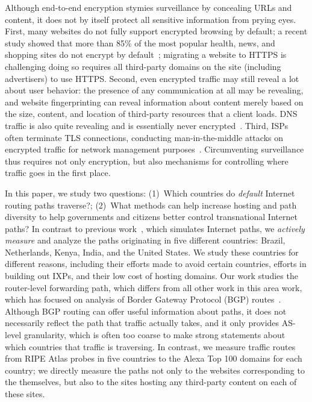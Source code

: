 Although end-to-end encryption stymies surveillance by
concealing URLs and content, it does not by itself protect all sensitive
information from prying eyes. First, many websites do not fully support
encrypted browsing by default; a recent study showed that more than 85\%
of the most popular health, news, and shopping sites do not encrypt by
default~\cite{what_isps_can_see}; migrating a website to HTTPS is
challenging doing so requires all third-party domains on the site
(including advertisers) to use HTTPS.  Second, even encrypted traffic
may still reveal a lot about user behavior: the presence of any
communication at all may be revealing, and website fingerprinting can
reveal information about content merely based on the size, content, and
location of third-party resources that a client loads. DNS traffic is
also quite revealing and is essentially never
encrypted~\cite{what_isps_can_see}.  Third, ISPs often terminate TLS
connections, conducting man-in-the-middle attacks on encrypted traffic
for network management purposes~\cite{mitm_isp}. Circumventing
surveillance thus requires not only encryption, but also mechanisms
for controlling where traffic goes in the first place.

In this paper, we study two questions: (1)~Which countries do {\em
  default} Internet routing paths traverse?; (2)~What methods can help
increase hosting and path diversity to help governments and citizens
better control transnational Internet paths?  In contrast to previous
work~\cite{karlin2009nation}, which simulates Internet paths, we
\textit{actively measure} and analyze the paths originating in five
different countries: Brazil, Netherlands, Kenya, India, and the United
States.  We study these countries for different reasons, including their
efforts made to avoid certain countries, efforts in building out IXPs,
and their low cost of hosting domains.  Our work studies the
router-level forwarding path, which differs from all other work in this
area work, which has focused on analysis of Border Gateway Protocol
(BGP) routes~\cite{karlin2009nation,shah2015characterizing}.  Although
BGP routing can offer useful information about paths, it does not
necessarily reflect the path that traffic actually takes, and it only
provides AS-level granularity, which is often too coarse to make strong
statements about which countries that traffic is traversing.  In
contrast, we measure traffic routes from RIPE Atlas probes in five
countries to the Alexa Top 100 domains for each country; we directly
measure the paths not only to the websites corresponding to the
themselves, but also to the sites hosting any third-party content on
each of these sites.

